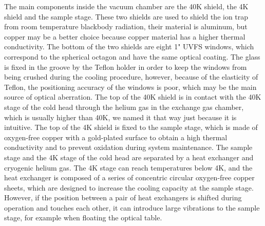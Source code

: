 The main components inside the vacuum chamber are the 40K shield, the 4K shield and the sample stage. These two shields are used to shield the ion trap from room temperature blackbody radiation, their material is aluminum, but copper may be a better choice because copper material has a higher thermal conductivity. The bottom of the two shields are eight 1" UVFS windows, which correspond to the spherical octagon and have the same optical coating. The glass is fixed in the groove by the Teflon holder in order to keep the windows from being crushed during the cooling procedure, however, because of the elasticity of Teflon, the positioning accuracy of the windows is poor, which may be the main source of optical aberration. The top of the 40K shield is in contact with the 40K stage of the cold head through the helium gas in the exchange gas chamber, which is usually higher than 40K, we named it that way just because it is intuitive. The top of the 4K shield is fixed to the sample stage, which is made of oxygen-free copper with a gold-plated surface to obtain a high thermal conductivity and to prevent oxidation during system maintenance. The sample stage and the 4K stage of the cold head are separated by a heat exchanger and cryogenic helium gas. The 4K stage can reach temperatures below 4K, and the heat exchanger is composed of a series of concentric circular oxygen-free copper sheets, which are designed to increase the cooling capacity at the sample stage. However, if the position between a pair of heat exchangers is shifted during operation and touches each other, it can introduce large vibrations to the sample stage, for example when floating the optical table.
